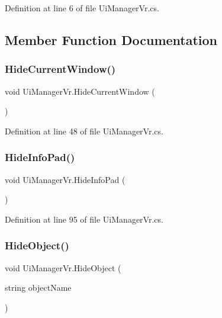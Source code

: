 Definition at line 6 of file Ui\+Manager\+Vr.\+cs.



\subsection{Member Function Documentation}
\mbox{\label{class_ui_manager_vr_a0cd1c6bfde1c157ec619602de6069802}} 
\subsubsection{\texorpdfstring{HideCurrentWindow()}{HideCurrentWindow()}}
{\footnotesize\ttfamily void Ui\+Manager\+Vr.\+Hide\+Current\+Window (\begin{DoxyParamCaption}{ }\end{DoxyParamCaption})}



Definition at line 48 of file Ui\+Manager\+Vr.\+cs.

\mbox{\label{class_ui_manager_vr_a7f563c162158404fe1fed2796bcac4a2}} 
\subsubsection{\texorpdfstring{HideInfoPad()}{HideInfoPad()}}
{\footnotesize\ttfamily void Ui\+Manager\+Vr.\+Hide\+Info\+Pad (\begin{DoxyParamCaption}{ }\end{DoxyParamCaption})}



Definition at line 95 of file Ui\+Manager\+Vr.\+cs.

\mbox{\label{class_ui_manager_vr_ab88b1cbcb7449cb5486547191f1b685b}} 
\subsubsection{\texorpdfstring{HideObject()}{HideObject()}}
{\footnotesize\ttfamily void Ui\+Manager\+Vr.\+Hide\+Object (\begin{DoxyParamCaption}\item[{string}]{object\+Name }\end{DoxyParamCaption})}



